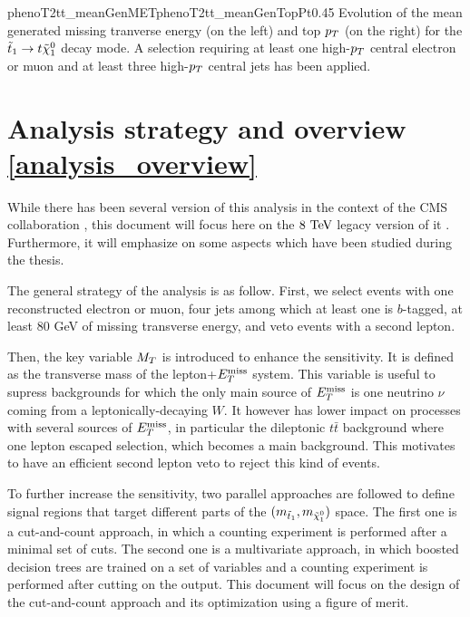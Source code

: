                      {phenoT2tt_meanGenMET}{phenoT2tt_meanGenTopPt}{0.45}
                     {Evolution of the mean generated missing tranverse energy (on the left) 
                     and top $p_T$ (on the right) for the $\tilde{t}_1 \rightarrow t \tilde{\chi}_1^0$ 
                     decay mode. A selection requiring at least one high-$p_T$ central 
                     electron or muon and at least three high-$p_T$ central jets has been 
                     applied.}
    
    \section{Analysis strategy and overview \ref{analysis_overview}}
   
    While there has been several version of this analysis in the context of the CMS 
    collaboration \cite{SUS-12-023-PAS, SUS-13-011-PUB, SUS-14-015-PAS}, this document 
    will focus here on the $8~\text{TeV}$ legacy version of it \cite{SUS-14-015-PAS}. Furthermore, 
    it will emphasize on some aspects which have been studied during the thesis.

    The general strategy of the analysis is as follow. First, we select events with one 
    reconstructed electron or muon, four jets among which at least one is $b$-tagged, 
    at least 80 GeV of missing transverse energy, and veto events with a second lepton. 

    Then, the key variable $M_T$ is introduced to enhance the sensitivity. It is defined as 
    the transverse mass of the lepton+$E_T^\text{miss}$ system. This variable is useful to supress
    backgrounds for which the only main source of $E_T^\text{miss}$ is one neutrino $\nu$ 
    coming from a leptonically-decaying $W$. It however has lower impact on processes with 
    several sources of $E_T^\text{miss}$, in particular the dileptonic $t\bar{t}$ background where one 
    lepton escaped selection, which becomes a main background. This motivates to have an 
    efficient second lepton veto to reject this kind of events.

    To further increase the sensitivity, two parallel approaches are followed to define
    signal regions that target different parts of the $(m_{\tilde{t}_1},m_{\tilde{\chi}_1^0})$
    space. The first one is a cut-and-count approach, in which a counting experiment is performed 
    after a minimal set of cuts. The second one is a multivariate approach, in which boosted 
    decision trees are trained on a set of variables and a counting experiment is performed 
    after cutting on the output. This document will focus on the design of the cut-and-count
    approach and its optimization using a figure of merit.

